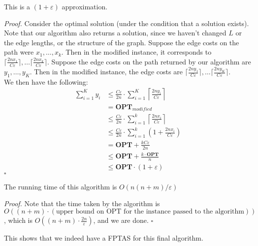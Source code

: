 \documentclass[a4paper]{article}
\newenvironment{proof}{\begin{breakbox}\textit{Proof.}}{\hfill$\square$\end{breakbox}}
\newcommand{\nl}{\vspace{0.2cm}\\}
\newcommand{\eps}{\varepsilon}
\newcommand{\OPT}{\mathbf{OPT}}
\begin{document}
\begin{claim}
    This is a $(1 + \eps)$ approximation.
\end{claim}
\begin{proof}
    Consider the optimal solution (under the condition that a solution exists). Note that our algorithm also returns a solution, since we haven't changed $L$ or the edge lengths, or the
    structure of the graph. Suppose the edge costs on the path were $x_1, \ldots, x_k$. Then in the modified instance, it corresponds to $\lceil\frac{2nx_1}{C\eps}\rceil,\ldots
    \lceil\frac{2nx_k}{C\eps}\rceil$. Suppose the edge costs on the path returned by our algorithm are $y_1, \ldots, y_K$. Then in the modified instance, the edge costs are $\lceil\frac{2ny_1}{C\eps}\rceil,\ldots
    \lceil\frac{2ny_K}{C\eps}\rceil$.\nl
    We then have the following:
    \begin{align*}
        \sum_{i = 1}^K y_i &\le \frac{C\eps}{2n} \cdot \sum_{i = 1}^K \left\lceil \frac{2n y_i}{C\eps} \right\rceil\\
                &= \OPT_{modified}\\
                &\le \frac{C\eps}{2n} \cdot \sum_{i = 1}^k \left\lceil \frac{2n x_i}{C\eps} \right\rceil\\
                &\le \frac{C\eps}{2n} \cdot \sum_{i = 1}^k \left(1 + \frac{2n x_i}{C \eps}\right)\\
                &= \OPT + \frac{kC\eps}{2n}\\
                &\le \OPT + \frac{k \cdot \OPT}{n}\\
                &\le \OPT \cdot (1 + \eps)
    \end{align*}
\end{proof}

\begin{claim}
    The running time of this algorithm is $O(n(n + m) / \eps)$
\end{claim}
\begin{proof}
    Note that the time taken by the algorithm is\\ $O((n + m) \cdot (\text{upper bound on OPT for the instance passed to the algorithm}))$, which is $O((n + m) \cdot \frac{2n}{\eps})$, and
    we are done.
\end{proof}

This shows that we indeed have a FPTAS for this final algorithm.
\end{document}
